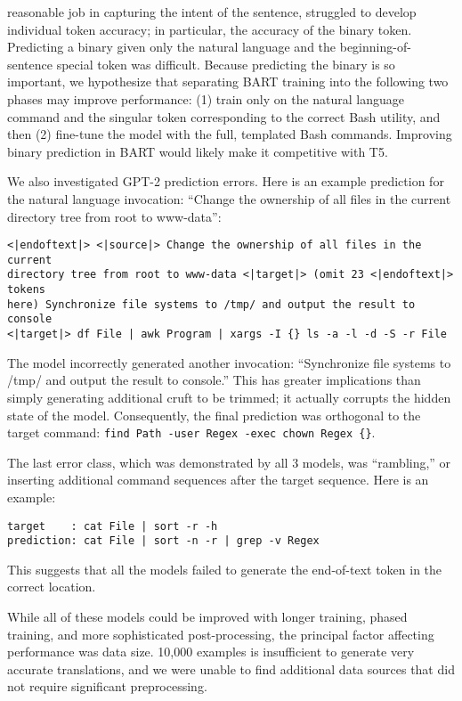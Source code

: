 reasonable job in capturing the intent of the sentence, struggled to develop
individual token accuracy; in particular, the accuracy of the binary token.
Predicting a binary given only the natural language and the
beginning-of-sentence special token was difficult. Because predicting the
binary is so important, we hypothesize that separating BART training into the
following two phases may improve performance: (1) train only on the natural
language command and the singular token corresponding to the correct Bash
utility, and then (2)
fine-tune the model with the full, templated Bash commands. Improving
binary prediction in BART would likely make it competitive with T5.
\par
We also investigated GPT-2 prediction errors. Here is an example prediction for the natural language invocation: ``Change the ownership of all files in the current directory tree from root to www-data'':

\begin{verbatim}
<|endoftext|> <|source|> Change the ownership of all files in the current 
directory tree from root to www-data <|target|> (omit 23 <|endoftext|> tokens 
here) Synchronize file systems to /tmp/ and output the result to console 
<|target|> df File | awk Program | xargs -I {} ls -a -l -d -S -r File
\end{verbatim}
The model incorrectly generated another invocation: ``Synchronize file systems to /tmp/ and output the result to console.'' This has greater implications than simply generating additional cruft to be trimmed; it actually corrupts the hidden state of the model. Consequently, the final prediction was orthogonal to the target command: \texttt{find Path -user Regex -exec chown Regex \{\}}.
\par
The last error class, which was demonstrated by all 3 models, was ``rambling,'' or inserting additional command sequences after the target sequence. Here is an example:
\begin{verbatim}
target    : cat File | sort -r -h 
prediction: cat File | sort -n -r | grep -v Regex
\end{verbatim}
This suggests that all the models failed to generate the end-of-text token in
the correct location.
\par
While all of these models could be improved with longer training, phased
training, and more sophisticated post-processing, the principal factor
affecting performance was data size. 10,000 examples is insufficient to
generate very accurate translations, and we were unable to find additional data
sources that did not require significant preprocessing.
